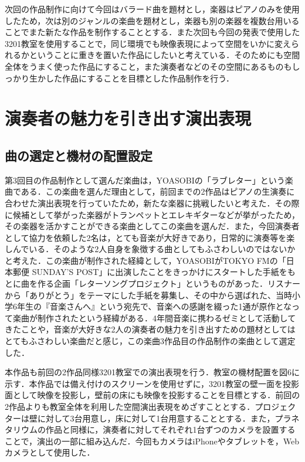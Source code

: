 \documentclass[submit,techrep,noauthor]{ipsj}
\begin{document}
次回の作品制作に向けて今回はバラード曲を題材とし，楽器はピアノのみを使用したため，次は別のジャンルの楽曲を題材とし，楽器も別の楽器を複数台用いることでまた新たな作品を制作することとする．また次回も今回の発表で使用した3201教室を使用することで，同じ環境でも映像表現によって空間をいかに変えられるかということに重きを置いた作品にしたいと考えている．そのためにも空間全体をうまく使った作品にすること，また演奏者などのその空間にあるものもしっかり生かした作品にすることを目標とした作品制作を行う．


\section{演奏者の魅力を引き出す演出表現}
\subsection{曲の選定と機材の配置設定}
第3回目の作品制作として選んだ楽曲は，YOASOBIの「ラブレター」\cite{loveletter}という楽曲である．この楽曲を選んだ理由として，前回までの2作品はピアノの生演奏に合わせた演出表現を行っていたため，新たな楽器に挑戦したいと考えた．その際に候補として挙がった楽器がトランペットとエレキギターなどが挙がったため，その楽器を活かすことができる楽曲としてこの楽曲を選んだ．また，今回演奏者として協力を依頼した2名は，とても音楽が大好きであり，日常的に演奏等を楽しんでいる．そのような2人自身を象徴する曲としてもふさわしいのではないかと考えた．この楽曲が制作された経緯として，YOASOBIがTOKYO FMの「日本郵便 SUNDAY’S POST」に出演したことをきっかけにスタートした手紙をもとに曲を作る企画「レターソングプロジェクト」\cite{lettersong}というものがあった．リスナーから「ありがとう」をテーマにした手紙を募集し、その中から選ばれた、当時小学6年生の『音楽さんへ』という宛先で、音楽への感謝を綴った1通が原作となって楽曲が制作されたという経緯がある．4年間音楽に携わるゼミとして活動してきたことや，音楽が大好きな2人の演奏者の魅力を引き出すための題材としてはとてもふさわしい楽曲だと感じ，この楽曲3作品目の作品制作の楽曲として選定した．

本作品も前回の2作品同様3201教室での演出表現を行う．教室の機材配置を図6に示す．本作品では備え付けのスクリーンを使用せずに，3201教室の壁一面を投影面として映像を投影し，壁前の床にも映像を投影することを目標とする．前回の2作品よりも教室全体を利用した空間演出表現をめざすこととする．プロジェクターは壁に対して3台用意し，床に対して1台用意することとする．また，プラネタリウムの作品と同様に，演奏者に対してそれぞれ1台ずつのカメラを設置することで，演出の一部に組み込んだ．今回もカメラはiPhoneやタブレットを，Webカメラとして使用した．
\end{document}
